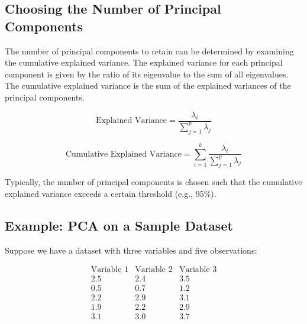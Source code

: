 \documentclass{article}
\begin{document}
\subsection{Choosing the Number of Principal Components}
The number of principal components to retain can be determined by examining the cumulative explained variance. The explained variance for each principal component is given by the ratio of its eigenvalue to the sum of all eigenvalues. The cumulative explained variance is the sum of the explained variances of the principal components.

\[
\text{Explained Variance} = \frac{\lambda_i}{\sum_{j=1}^{p} \lambda_j}
\]

\[
\text{Cumulative Explained Variance} = \sum_{i=1}^{k} \frac{\lambda_i}{\sum_{j=1}^{p} \lambda_j}
\]

Typically, the number of principal components is chosen such that the cumulative explained variance exceeds a certain threshold (e.g., 95\%).

\subsection{Example: PCA on a Sample Dataset}
Suppose we have a dataset with three variables and five observations:

\[
\begin{array}{ccc}
\text{Variable 1} & \text{Variable 2} & \text{Variable 3} \\
2.5 & 2.4 & 3.5 \\
0.5 & 0.7 & 1.2 \\
2.2 & 2.9 & 3.1 \\
1.9 & 2.2 & 2.9 \\
3.1 & 3.0 & 3.7 \\
\end{array}
\]
\end{document}

